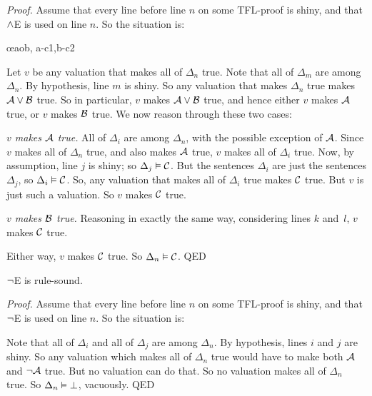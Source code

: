 \emph{Proof.}
	Assume that every line before line $n$ on some TFL-proof is shiny, and that $\wedge$E is used on line $n$. So the situation is:
   \begin{fitchproof}
	   \open
		   \AS %
	   \close
	   \open
		   \AS %
	   \close
	   \oe{aob, a-c1,b-c2}
   \end{fitchproof}\noindent
Let $v$ be any valuation that makes all of $\Delta_{n}$ true. Note that all of $\Delta_m$ are among $\Delta_{n}$. By hypothesis, line $m$ is shiny. So any valuation that makes $\Delta_{n}$ true makes $\mathcal{A} \vee \mathcal{B}$ true. So in particular, $v$ makes $\mathcal{A} \vee \mathcal{B}$ true, and hence either $v$ makes $\mathcal{A}$ true, or $v$ makes $\mathcal{B}$ true. We now reason through these two cases:
   \begin{numberlist}
	   \item \emph{$v$ makes $\mathcal{A}$ true.} All of $\Delta_i$ are among $\Delta_{n}$, with the possible exception of $\mathcal{A}$. Since $v$ makes all of $\Delta_{n}$ true, and also makes $\mathcal{A}$ true,  $v$ makes all of $\Delta_i$ true. Now, by assumption, line $j$ is shiny; so $\Delta_{j} \vDash \mathcal{C}$. But the sentences $\Delta_i$ are just the sentences $\Delta_{j}$, so $\Delta_i \vDash \mathcal{C}$. So, any valuation that makes all of $\Delta_i$ true makes $\mathcal{C}$ true. But $v$ is just such a valuation. So $v$ makes $\mathcal{C}$ true.
	   \item \emph{$v$ makes $\mathcal{B}$ true.} Reasoning in exactly the same way, considering lines $k$ and~$l$, $v$ makes $\mathcal{C}$ true.
	   \end{numberlist}
Either way, $v$ makes $\mathcal{C}$ true. So $\Delta_n \vDash \mathcal{C}$.
QED


\begin{factoidboxe}
	$\neg$E is rule-sound.
\end{factoidboxe}

\emph{Proof.}
	Assume that every line before line $n$ on some TFL-proof is shiny, and that $\neg$E is used on line $n$. So the situation is:
\begin{fitchproof}
\end{fitchproof}\noindent
Note that all of $\Delta_i$ and all of $\Delta_j$ are among $\Delta_{n}$. By hypothesis, lines $i$ and $j$ are shiny. So any valuation which makes all of $\Delta_{n}$ true would have to make both $\mathcal{A}$ and $\neg\mathcal{A}$ true. But no valuation can do that. So no valuation makes all of $\Delta_{n}$ true. So $\Delta_{n} \vDash \bot$, vacuously.
QED

